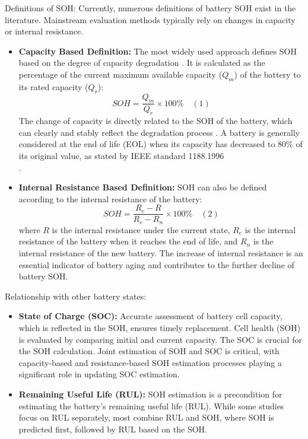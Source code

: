 Definitions of SOH:
Currently, numerous definitions of battery SOH exist in the literature\cite{s41598-025-92262-8}. Mainstream evaluation methods typically rely on changes in capacity or internal resistance\cite{electronics-13-01675}.
\begin{itemize}
    \item \textbf{Capacity Based Definition:} The most widely used approach defines SOH based on the degree of capacity degradation \cite{s41598-025-92262-8}. It is calculated as the percentage of the current maximum available capacity ($Q_m$) of the battery to its rated capacity ($Q_r$)\cite{electronics-13-01675}\cite{wevj-12-00113}: $$SOH = \frac{Q_m}{Q_r} \times 100\% \quad (1)$$ The change of capacity is directly related to the SOH of the battery, which can clearly and stably reflect the degradation process \cite{s41598-025-92262-8}. A battery is generally considered at the end of life (EOL) when its capacity has decreased to 80\% of its original value, as stated by IEEE standard 1188.1996\\ \cite{wevj-12-00113}\cite{energies-18-00342-v2}.
    \item \textbf{Internal Resistance Based Definition:}  SOH can also be defined according to the internal resistance of the battery\cite{wevj-12-00113}: $$SOH = \frac{R_e - R}{R_e - R_n} \times 100\% \quad (2)$$ where $R$ is the internal resistance under the current state, $R_e$ is the internal resistance of the battery when it reaches the end of life, and $R_n$ is the internal resistance of the new battery\cite{wevj-12-00113}. The increase of internal resistance is an essential indicator of battery aging and contributes to the further decline of battery SOH\cite{wevj-12-00113}.
\end{itemize}

Relationship with other battery states:
\begin{itemize}
    \item \textbf{State of Charge (SOC):} Accurate assessment of battery cell capacity, which is reflected in the SOH, ensures timely replacement. Cell health (SOH) is evaluated by comparing initial and current capacity. The SOC is crucial for the SOH calculation\cite{energies-13-01811-v2}. Joint estimation of SOH and SOC is critical, with capacity-based and resistance-based SOH estimation processes playing a significant role in updating SOC estimation\cite{energies-13-01811-v2}.
    \item \textbf{Remaining Useful Life (RUL):} SOH estimation is a precondition for estimating the battery's remaining useful life (RUL)\cite{wevj-12-00120-v2}. While some studies focus on RUL separately, most combine RUL and SOH, where SOH is predicted first, followed by RUL based on the SOH\cite{batteries-10-00181-v2}.
\end{itemize}

